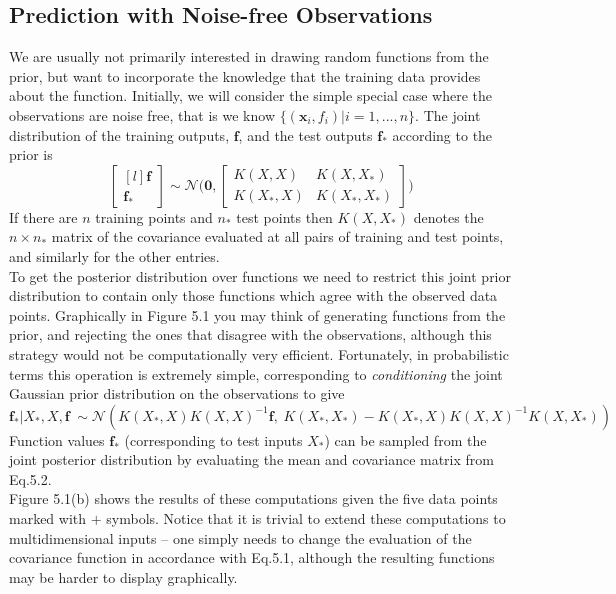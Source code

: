 \documentclass[twoside]{article}
\begin{document}
\subsection{Prediction with Noise-free Observations}
We are usually not primarily interested in drawing random functions from the prior, but want to incorporate the knowledge that the training data provides about the function. Initially, we will consider the simple special case where the observations are noise free, that is we know $\{(\boldsymbol{x}_i, f_i)|i = 1,...,n\}$. The joint distribution of the training outputs, $\textbf{f}$, and the test outputs $\textbf{f}_*$ according to the prior is
\begin{equation*}
    \begin{bmatrix*}[l]
\textbf{f}\\
\textbf{f}_*
\end{bmatrix*}
\sim \mathcal{N}\Bigg(\boldsymbol{0}, \begin{bmatrix*}
K(X, X) & K(X, X_*)\\
K(X_*, X) & K(X_*, X_*)
\end{bmatrix*}\Bigg)
\end{equation*}
If there are $n$ training points and $n_*$ test points then $K(X, X_*)$ denotes the $n\times n_*$ matrix of the covariance evaluated at all pairs of training and test points, and similarly for the other entries.\\
To get the posterior distribution over functions we need to restrict this joint prior distribution to contain only those functions which agree with the observed data points. Graphically in Figure 5.1 you may think of generating functions from the prior, and rejecting the ones that disagree with the observations, although this strategy would not be computationally very efficient. Fortunately, in probabilistic terms this operation is extremely simple, corresponding to \textit{conditioning} the joint Gaussian prior distribution on the observations to give
\begin{equation}
    \textbf{f}_*|X_*,X, \textbf{f} \hspace{3pt}\sim \mathcal{N}(K(X_*, X)K(X, X)^{-1}\textbf{f},\hspace{3pt} K(X_*, X_*) - K(X_*, X)K(X, X)^{-1}K(X, X_*))
\end{equation}
Function values $\textbf{f}_*$ (corresponding to test inputs $X_*$) can be sampled from the joint posterior distribution by evaluating the mean and covariance matrix from Eq.5.2.\\
Figure 5.1(b) shows the results of these computations given the five data points marked with $+$ symbols. Notice that it is trivial to extend these computations to multidimensional inputs – one simply needs to change the evaluation of the covariance function in accordance with Eq.5.1, although the resulting functions may be harder to display graphically.
\end{document}
